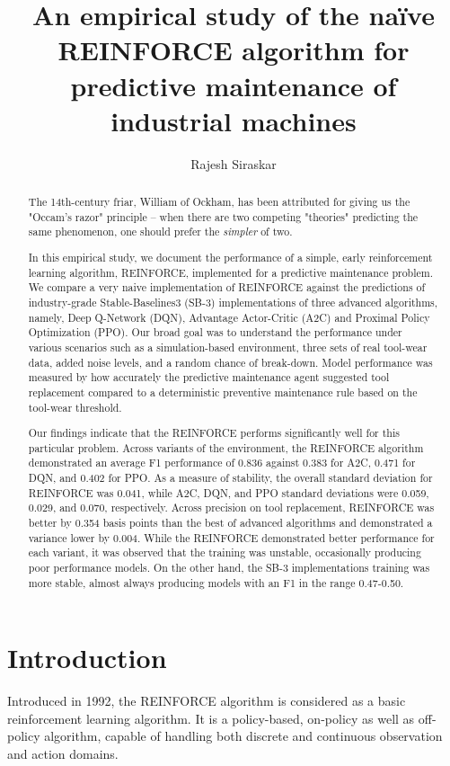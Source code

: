 \documentclass[]{article}
\title{An empirical study of the na\"ive REINFORCE algorithm for predictive maintenance of industrial machines}
\author{Rajesh Siraskar}
\begin{document}
\maketitle

\begin{abstract}
The 14th-century friar, William of Ockham, has been attributed for giving us the "Occam's razor" principle -- when there are two competing "theories" predicting the same phenomenon, one should prefer the \textit{simpler} of two.

In this empirical study, we document the performance of a simple, early reinforcement learning algorithm, REINFORCE, implemented for a predictive maintenance problem. We compare a very naive implementation of REINFORCE against the predictions of industry-grade Stable-Baselines3 (SB-3) implementations of three advanced algorithms, namely, Deep Q-Network (DQN), Advantage Actor-Critic (A2C) and Proximal Policy Optimization (PPO). Our broad goal was to understand the performance under various scenarios such as a simulation-based environment, three sets of real tool-wear data, added noise levels, and a random chance of break-down. Model performance was measured by how accurately the predictive maintenance agent suggested tool replacement compared to a deterministic preventive maintenance rule based on the tool-wear threshold. 

Our findings indicate that the REINFORCE performs significantly well for this particular problem. Across variants of the environment, the REINFORCE algorithm demonstrated an average F1 performance of 0.836 against 0.383 for A2C, 0.471 for DQN, and 0.402 for PPO. As a measure of stability, the overall standard deviation for REINFORCE was 0.041, while A2C, DQN, and PPO standard deviations were 0.059, 0.029, and 0.070, respectively. Across precision on tool replacement, REINFORCE was better by 0.354 basis points than the best of advanced algorithms and demonstrated a variance lower by 0.004. While the REINFORCE demonstrated better performance for each variant, it was observed that the training was unstable, occasionally producing poor performance models. On the other hand, the SB-3 implementations training was more stable, almost always producing models with an F1 in the range 0.47-0.50.


\end{abstract}

\section{Introduction}
Introduced in 1992, the REINFORCE algorithm is considered as a basic reinforcement learning algorithm. It is a policy-based, on-policy as well as off-policy algorithm, capable of handling both discrete and continuous observation and action domains.
\end{document}
